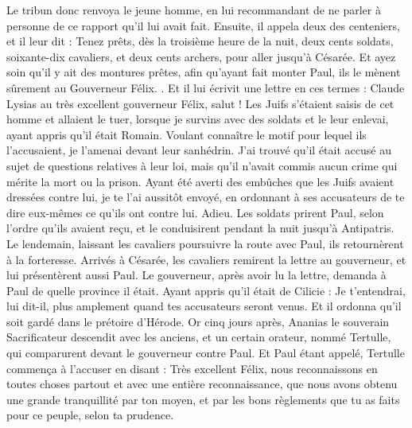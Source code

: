 \begin{multicols}{2}
{{{Le tribun donc renvoya le jeune homme, en lui recommandant de ne parler à personne de ce rapport qu'il lui avait fait.
Ensuite, il appela deux des centeniers, et il leur dit : Tenez prêts, dès la troisième heure de la nuit, deux cents soldats, soixante-dix cavaliers, et deux cents archers, pour aller jusqu'à Césarée.
Et ayez soin qu'il y ait des montures prêtes, afin qu'ayant fait monter Paul, ils le mènent sûrement au Gouverneur Félix. .
Et il lui écrivit une lettre en ces termes :
Claude Lysias au très excellent gouverneur Félix, salut !
Les Juifs s'étaient saisis de cet homme et allaient le tuer, lorsque je survins avec des soldats et le leur enlevai, ayant appris qu'il était Romain.
Voulant connaître le motif pour lequel ils l'accusaient, je l'amenai devant leur sanhédrin.
J'ai trouvé qu'il était accusé au sujet de questions relatives à leur loi, mais qu'il n'avait commis aucun crime qui mérite la mort ou la prison.
Ayant été averti des embûches que les Juifs avaient dressées contre lui, je te l'ai aussitôt envoyé, en ordonnant à ses accusateurs de te dire eux-mêmes ce qu'ils ont contre lui. Adieu.
Les soldats prirent Paul, selon l'ordre qu'ils avaient reçu, et le conduisirent pendant la nuit jusqu'à Antipatris.
Le lendemain, laissant les cavaliers poursuivre la route avec Paul, ils retournèrent à la forteresse.
Arrivés à Césarée, les cavaliers remirent la lettre au gouverneur, et lui présentèrent aussi Paul.
Le gouverneur, après avoir lu la lettre, demanda à Paul de quelle province il était. Ayant appris qu'il était de Cilicie :
Je t'entendrai, lui dit-il, plus amplement quand tes accusateurs seront venus. Et il ordonna qu'il soit gardé dans le prétoire d'Hérode.
\VerseOne{}Or cinq jours après, Ananias le souverain Sacrificateur descendit avec les anciens, et un certain orateur, nommé Tertulle, qui comparurent devant le gouverneur contre Paul. 
Et Paul étant appelé, Tertulle commença à l'accuser en disant :
Très excellent Félix, nous reconnaissons en toutes choses partout et avec une entière reconnaissance, que nous avons obtenu une grande tranquillité par ton moyen, et par les bons règlements que tu as faits pour ce peuple, selon ta prudence.
}}}
\end{multicols}
